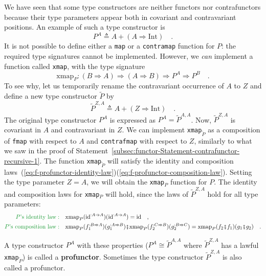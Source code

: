 We have seen that some type constructors are neither functors nor
contrafunctors because their type parameters appear both in covariant
and contravariant positions. An example of such a type constructor
is
\[
P^{A}\triangleq A+\left(A\Rightarrow\text{Int}\right)\quad.
\]
It is not possible to define either a \lstinline!map! or a \lstinline!contramap!
function for $P$: the required type signatures cannot be implemented.
However, we \emph{can} implement a function called \lstinline!xmap!,
with the type signature
\[
\text{xmap}_{P}:\left(B\Rightarrow A\right)\Rightarrow\left(A\Rightarrow B\right)\Rightarrow P^{A}\Rightarrow P^{B}\quad.
\]
To see why, let us temporarily rename the contravariant occurrence
of $A$ to $Z$ and define a new type constructor $\tilde{P}$ by
\[
\tilde{P}^{Z,A}\triangleq A+\left(Z\Rightarrow\text{Int}\right)\quad.
\]
The original type constructor $P^{A}$ is expressed as $P^{A}=\tilde{P}^{A,A}$.
Now, $\tilde{P}^{Z,A}$ is covariant in $A$ and contravariant in
$Z$. We can implement \lstinline!xmap!$_{\tilde{P}}$ as a composition
of \lstinline!fmap! with respect to $A$ and \lstinline!contrafmap!
with respect to $Z$, similarly to what we saw in the proof of Statement~\ref{subsec:functor-Statement-contrafunctor-recursive-1}.
The function \lstinline!xmap!$_{\tilde{P}}$ will satisfy the identity
and composition laws~(\ref{eq:f-profunctor-identity-law})\textendash (\ref{eq:f-profunctor-composition-law}).
Setting the type parameter $Z=A$, we will obtain the \lstinline!xmap!$_{P}$
function for $P$. The identity and composition laws for \lstinline!xmap!$_{P}$
will hold, since the laws of $\tilde{P}^{Z,A}$ hold for all type
parameters:
\begin{align*}
{\color{greenunder}P\text{'s identity law}:}\quad & \text{xmap}_{P}(\text{id}^{:A\Rightarrow A})(\text{id}^{:A\Rightarrow A})=\text{id}\quad,\\
{\color{greenunder}P\text{'s composition law}:}\quad & \text{xmap}_{P}(f_{1}^{:B\Rightarrow A})(g_{1}^{:A\Rightarrow B})\bef\text{xmap}_{P}(f_{2}^{:C\Rightarrow B})(g_{2}^{:B\Rightarrow C})=\text{xmap}_{P}(f_{2}\bef f_{1})(g_{1}\bef g_{2})\quad.
\end{align*}

A type constructor $P^{A}$ with these properties ($P^{A}\cong\tilde{P}^{A,A}$
where $\tilde{P}^{Z,A}$ has a lawful \lstinline!xmap!$_{\tilde{P}}$)
is called a \textbf{profunctor}. Sometimes
the type constructor $\tilde{P}^{Z,A}$ is also called a profunctor.

